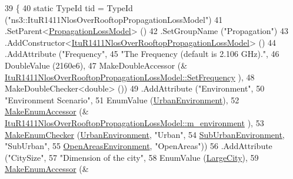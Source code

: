 \begin{DoxyCode}
39 \{
40   \textcolor{keyword}{static} TypeId tid = TypeId (\textcolor{stringliteral}{"ns3::ItuR1411NlosOverRooftopPropagationLossModel"})
41     .SetParent<\hyperlink{classns3_1_1PropagationLossModel_ace8b78c2c8e805cd0a919d7e3543318c}{PropagationLossModel}> ()
42     .SetGroupName (\textcolor{stringliteral}{"Propagation"})
43     .AddConstructor<\hyperlink{classns3_1_1ItuR1411NlosOverRooftopPropagationLossModel_aa173c36ea44d328e68cf45404f333c35}{ItuR1411NlosOverRooftopPropagationLossModel}>
       ()
44     .AddAttribute (\textcolor{stringliteral}{"Frequency"},
45                    \textcolor{stringliteral}{"The Frequency  (default is 2.106 GHz)."},
46                    DoubleValue (2160e6),
47                    MakeDoubleAccessor (&
      \hyperlink{classns3_1_1ItuR1411NlosOverRooftopPropagationLossModel_a3248a2753e007540853bd6a9483a9b22}{ItuR1411NlosOverRooftopPropagationLossModel::SetFrequency}
      ),
48                    MakeDoubleChecker<double> ())
49     .AddAttribute (\textcolor{stringliteral}{"Environment"},
50                    \textcolor{stringliteral}{"Environment Scenario"},
51                    EnumValue (\hyperlink{group__propagation_gga0e392ed771a28c92112047e63308a53aad575d1b07ccac0218783bbd0f523784c}{UrbanEnvironment}),
52                    \hyperlink{namespacens3_af5050739867ce63896dec011e332c8ec}{MakeEnumAccessor} (&
      \hyperlink{classns3_1_1ItuR1411NlosOverRooftopPropagationLossModel_a90b4674c71607edfaeeac8e473cd56ab}{ItuR1411NlosOverRooftopPropagationLossModel::m\_environment}
      ),
53                    \hyperlink{namespacens3_a48832781a2b521d3d0091e05ece30615}{MakeEnumChecker} (\hyperlink{group__propagation_gga0e392ed771a28c92112047e63308a53aad575d1b07ccac0218783bbd0f523784c}{UrbanEnvironment}, \textcolor{stringliteral}{"Urban"},
54                                     \hyperlink{group__propagation_gga0e392ed771a28c92112047e63308a53aa06cbfe108cde1eb2070702b2ed4fb189}{SubUrbanEnvironment}, \textcolor{stringliteral}{"SubUrban"},
55                                     \hyperlink{group__propagation_gga0e392ed771a28c92112047e63308a53aa51f78effebc3753d7cd2ee9b5924c028}{OpenAreasEnvironment}, \textcolor{stringliteral}{"OpenAreas"}))
56     .AddAttribute (\textcolor{stringliteral}{"CitySize"},
57                    \textcolor{stringliteral}{"Dimension of the city"},
58                    EnumValue (\hyperlink{group__propagation_gga29c9a1b1a58b6a56054ff5ea4c5a574da017d6be2af0a102a6147e6519d63f54c}{LargeCity}),
59                    \hyperlink{namespacens3_af5050739867ce63896dec011e332c8ec}{MakeEnumAccessor} (&

\end{DoxyCode}
